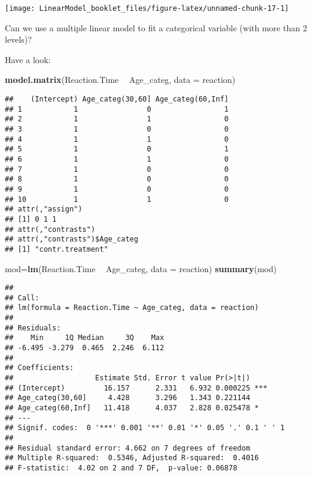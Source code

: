 \documentclass[
]{article}
\newenvironment{Shaded}{\begin{snugshade}}{\end{snugshade}}
\newcommand{\DataTypeTok}[1]{\textcolor[rgb]{0.13,0.29,0.53}{#1}}
\newcommand{\KeywordTok}[1]{\textcolor[rgb]{0.13,0.29,0.53}{\textbf{#1}}}
\newcommand{\NormalTok}[1]{#1}
\newcommand{\OperatorTok}[1]{\textcolor[rgb]{0.81,0.36,0.00}{\textbf{#1}}}
\newcommand{\StringTok}[1]{\textcolor[rgb]{0.31,0.60,0.02}{#1}}
\begin{document}
\begin{center}\texttt{[image: LinearModel\_booklet\_files/figure-latex/unnamed-chunk-17-1]} \end{center}

Can we use a multiple linear model to fit a categorical variable (with
more than 2 levels)?

Have a look:

\begin{Shaded}
\begin{Highlighting}[]
\KeywordTok{model.matrix}\NormalTok{(Reaction.Time }\OperatorTok{~}\StringTok{ }\NormalTok{Age_categ, }\DataTypeTok{data =}\NormalTok{ reaction)}
\end{Highlighting}
\end{Shaded}

\begin{verbatim}
##    (Intercept) Age_categ(30,60] Age_categ(60,Inf]
## 1            1                0                 1
## 2            1                1                 0
## 3            1                0                 0
## 4            1                1                 0
## 5            1                0                 1
## 6            1                1                 0
## 7            1                0                 0
## 8            1                0                 0
## 9            1                0                 0
## 10           1                1                 0
## attr(,"assign")
## [1] 0 1 1
## attr(,"contrasts")
## attr(,"contrasts")$Age_categ
## [1] "contr.treatment"
\end{verbatim}

\begin{Shaded}
\begin{Highlighting}[]
\NormalTok{mod=}\KeywordTok{lm}\NormalTok{(Reaction.Time }\OperatorTok{~}\StringTok{ }\NormalTok{Age_categ, }\DataTypeTok{data =}\NormalTok{ reaction)}
\KeywordTok{summary}\NormalTok{(mod)}
\end{Highlighting}
\end{Shaded}

\begin{verbatim}
## 
## Call:
## lm(formula = Reaction.Time ~ Age_categ, data = reaction)
## 
## Residuals:
##    Min     1Q Median     3Q    Max 
## -6.495 -3.279  0.465  2.246  6.112 
## 
## Coefficients:
##                   Estimate Std. Error t value Pr(>|t|)    
## (Intercept)         16.157      2.331   6.932 0.000225 ***
## Age_categ(30,60]     4.428      3.296   1.343 0.221144    
## Age_categ(60,Inf]   11.418      4.037   2.828 0.025478 *  
## ---
## Signif. codes:  0 '***' 0.001 '**' 0.01 '*' 0.05 '.' 0.1 ' ' 1
## 
## Residual standard error: 4.662 on 7 degrees of freedom
## Multiple R-squared:  0.5346, Adjusted R-squared:  0.4016 
## F-statistic:  4.02 on 2 and 7 DF,  p-value: 0.06878
\end{verbatim}
\end{document}
